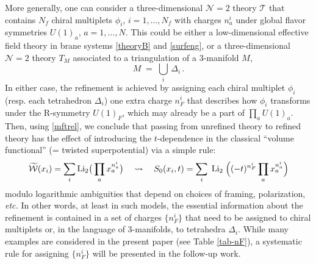 \documentclass[hyper,letterpaper]{JHEP3}
\newcommand{\be}{\begin{equation}}
\newcommand{\ee}{\end{equation}}
\newcommand{\cN}{{\mathcal{N}}}
\begin{document}
More generally, one can consider a three-dimensional $\cN=2$ theory $\mathcal{T}$
that contains $N_f$ chiral multiplets $\phi_i$, $i=1, \ldots, N_f$
with charges $n^i_a$ under global flavor symmetries $U(1)_a$, $a = 1, \ldots, N$.
This could be either a low-dimensional effective field theory in brane systems \eqref{theoryB} and \eqref{surfeng},
or a three-dimensional $\cN=2$ theory $T_M$ associated to a triangulation of a 3-manifold $M$,
\be
M \; = \; \bigcup_i \, \Delta_i \,.
\ee
In either case, the refinement is achieved by assigning each chiral multiplet $\phi_i$ (resp. each tetrahedron $\Delta_i$)
one extra charge $n_F^i$ that describes how $\phi_i$ transforms under the R-symmetry $U(1)_F$,
which may already be a part of $\prod_a U(1)_a$.
Then, using \eqref{mftrel}, we conclude that passing from unrefined theory
to refined theory has the effect of introducing the $t$-dependence in
the classical ``volume functional'' (= twisted superpotential) via a simple rule:
\be
\widetilde{\cal W} (x_i) = \sum_i \textrm{Li}_2 \big( \prod_a x_a^{n_a^i} \big)
\quad \leadsto \quad
S_0 (x_i, t) = \sum_i \; \textrm{Li}_2 \; \Big( (-t)^{n_F^i} \prod_a x_a^{n_a^i} \Big)
\ee
modulo logarithmic ambiguities that depend on choices of framing, polarization, {\it etc.}
In other words, at least in such models,
the essential information about the refinement is contained in a set of charges $\{ n_F^i \}$
that need to be assigned to chiral multiplets or, in the language of 3-manifolds, to tetrahedra $\Delta_i$.
While many examples are considered in the present paper (see Table \ref{tab-nF}),
a systematic rule for assigning $\{ n_F^i \}$ will be presented in the follow-up work.






\end{document}

